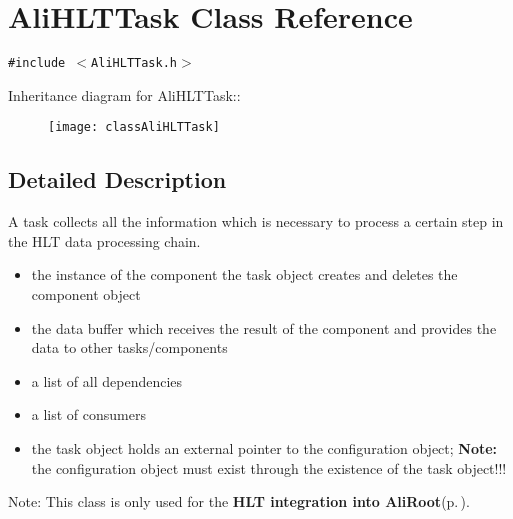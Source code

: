 \section{Ali\-HLTTask Class Reference}
\label{classAliHLTTask}
{\tt \#include $<$Ali\-HLTTask.h$>$}

Inheritance diagram for Ali\-HLTTask::\begin{figure}[H]
\begin{center}
\leavevmode
\texttt{[image: classAliHLTTask]}
\end{center}
\end{figure}


\subsection{Detailed Description}
A task collects all the information which is necessary to process a certain step in the HLT data processing chain.\begin{itemize}
\item the instance of the component the task object creates and deletes the component object\item the data buffer which receives the result of the component and provides the data to other tasks/components\item a list of all dependencies\item a list of consumers\item the task object holds an external pointer to the configuration object; {\bf Note:} the configuration object must exist through the existence of the task object!!!\end{itemize}


\begin{Desc}
\item[Note:]This class is only used for the {\bf HLT integration into Ali\-Root}{\rm (p.\,\pageref{group__alihlt__system})}. \end{Desc}




